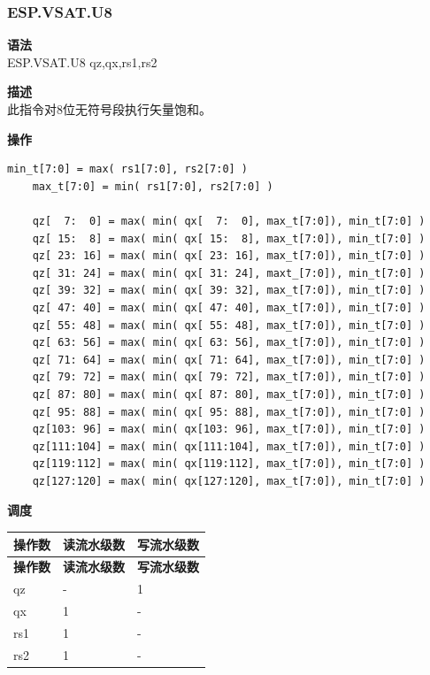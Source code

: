 \newpage
\subsubsection{ESP.VSAT.U8}\label{instruction:ESPVSATU8}
\textbf{语法}\\
ESP.VSAT.U8 qz,qx,rs1,rs2

\textbf{描述}\\
此指令对8位无符号段执行矢量饱和。

\textbf{操作}\\
\begin{lstlisting}[escapeinside=`?]
    min_t[7:0] = max( rs1[7:0], rs2[7:0] )
    max_t[7:0] = min( rs1[7:0], rs2[7:0] )

    qz[  7:  0] = max( min( qx[  7:  0], max_t[7:0]), min_t[7:0] )
    qz[ 15:  8] = max( min( qx[ 15:  8], max_t[7:0]), min_t[7:0] )
    qz[ 23: 16] = max( min( qx[ 23: 16], max_t[7:0]), min_t[7:0] )
    qz[ 31: 24] = max( min( qx[ 31: 24], maxt_[7:0]), min_t[7:0] )
    qz[ 39: 32] = max( min( qx[ 39: 32], max_t[7:0]), min_t[7:0] )
    qz[ 47: 40] = max( min( qx[ 47: 40], max_t[7:0]), min_t[7:0] )
    qz[ 55: 48] = max( min( qx[ 55: 48], max_t[7:0]), min_t[7:0] )
    qz[ 63: 56] = max( min( qx[ 63: 56], max_t[7:0]), min_t[7:0] )
    qz[ 71: 64] = max( min( qx[ 71: 64], max_t[7:0]), min_t[7:0] )
    qz[ 79: 72] = max( min( qx[ 79: 72], max_t[7:0]), min_t[7:0] )
    qz[ 87: 80] = max( min( qx[ 87: 80], max_t[7:0]), min_t[7:0] )
    qz[ 95: 88] = max( min( qx[ 95: 88], max_t[7:0]), min_t[7:0] )
    qz[103: 96] = max( min( qx[103: 96], max_t[7:0]), min_t[7:0] )
    qz[111:104] = max( min( qx[111:104], max_t[7:0]), min_t[7:0] )
    qz[119:112] = max( min( qx[119:112], max_t[7:0]), min_t[7:0] )
    qz[127:120] = max( min( qx[127:120], max_t[7:0]), min_t[7:0] )
\end{lstlisting}


\textbf{调度}\\
\begin{longtable}[c]{|l|l|l|}
    \hline
    \rowcolor{lightgray}
    \textbf{操作数} & \textbf{读流水级数} & \textbf{写流水级数} \\\hline
    \endfirsthead
    \hline
    \rowcolor{lightgray}
     \textbf{操作数} & \textbf{读流水级数} & \textbf{写流水级数} \\\hline
    \endhead
    \hline
    \endfoot

  qz & - & 1 \\\hline
    qx & 1 & - \\\hline
    rs1 & 1 & - \\\hline
    rs2 & 1 & -

\end{longtable}

